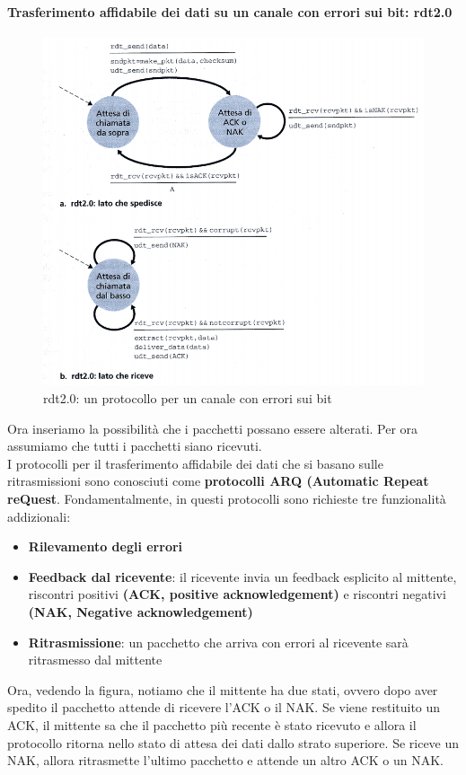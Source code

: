 \documentclass[11pt,a4paper]{article}
\begin{document}
\paragraph{Trasferimento affidabile dei dati su un canale con errori sui bit: rdt2.0}
\begin{figure}
	\includegraphics[scale=0.6]{img/018.png}
	\caption{rdt2.0: un protocollo per un canale con errori sui bit}
\end{figure}
Ora inseriamo la possibilità che i pacchetti possano essere alterati. Per ora assumiamo che tutti i pacchetti siano ricevuti.\\
I protocolli per il trasferimento affidabile dei dati che si basano sulle ritrasmissioni sono conosciuti come \textbf{protocolli ARQ (Automatic Repeat reQuest}. Fondamentalmente, in questi protocolli sono richieste tre funzionalità addizionali:
\begin{itemize}
	\item \textbf{Rilevamento degli errori}
	\item \textbf{Feedback dal ricevente}: il ricevente invia un feedback esplicito al mittente,  riscontri positivi \textbf{(ACK, positive acknowledgement)} e riscontri negativi \textbf{(NAK, Negative acknowledgement)}
	\item \textbf{Ritrasmissione}: un pacchetto che arriva con errori al ricevente sarà ritrasmesso dal mittente
\end{itemize}
Ora, vedendo la figura, notiamo che il mittente ha due stati, ovvero dopo aver spedito il pacchetto attende di ricevere l'ACK o il NAK. Se viene restituito un ACK, il mittente sa che il pacchetto più recente è stato ricevuto e allora il protocollo ritorna nello stato di attesa dei dati dallo strato superiore. Se riceve un NAK, allora ritrasmette l'ultimo pacchetto e attende un altro ACK o un NAK. \\
\end{document}
